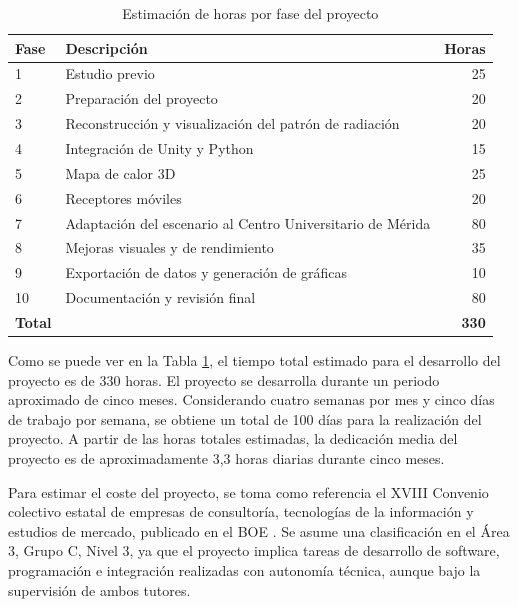 \begin{table}[H]
    \centering
    \begin{tabularx}{\textwidth}{@{}lXr@{}}
        \toprule
        \textbf{Fase} & \textbf{Descripción} & \textbf{Horas} \\
        \midrule
        1 & Estudio previo & 25 \\
        2 & Preparación del proyecto & 20 \\
        3 & Reconstrucción y visualización del patrón de radiación & 20 \\
        4 & Integración de Unity y Python & 15 \\
        5 & Mapa de calor 3D & 25 \\
        6 & Receptores móviles & 20 \\
        7 & Adaptación del escenario al Centro Universitario de Mérida & 80 \\
        8 & Mejoras visuales y de rendimiento & 35 \\
        9 & Exportación de datos y generación de gráficas & 10 \\
        10 & Documentación y revisión final & 80 \\
        \midrule
        \textbf{Total} & & \textbf{330} \\
        \bottomrule
    \end{tabularx}
    \caption{Estimación de horas por fase del proyecto}
    \label{tab:estimacion_horas_proyecto}
\end{table}

Como se puede ver en la Tabla \ref{tab:estimacion_horas_proyecto}, el tiempo total estimado para el desarrollo del proyecto es de 330 horas. El proyecto se desarrolla durante un periodo aproximado de cinco meses. Considerando cuatro semanas por mes y cinco días de trabajo por semana, se obtiene un total de 100 días para la realización del proyecto. A partir de las horas totales estimadas, la dedicación media del proyecto es de aproximadamente 3,3 horas diarias durante cinco meses.

Para estimar el coste del proyecto, se toma como referencia el XVIII Convenio colectivo estatal de empresas de consultoría, tecnologías de la información y estudios de mercado, publicado en el BOE \cite{boe_convenio_consultoria}. Se asume una clasificación en el Área 3, Grupo C, Nivel 3, ya que el proyecto implica tareas de desarrollo de software, programación e integración realizadas con autonomía técnica, aunque bajo la supervisión de ambos tutores.

